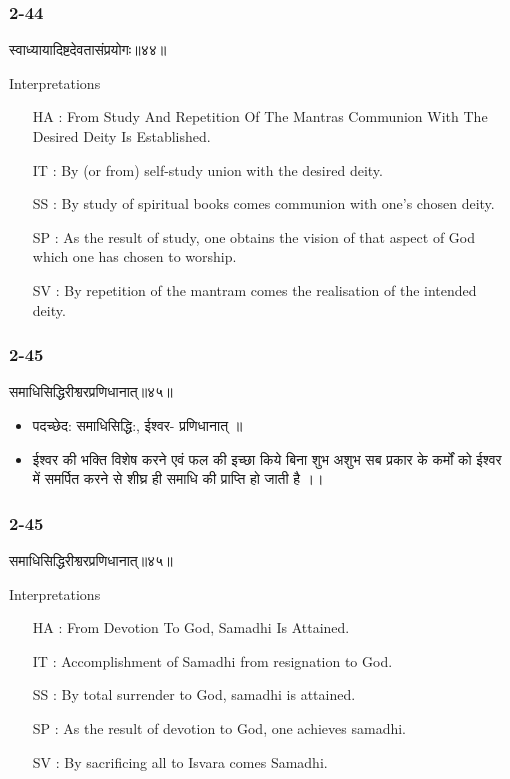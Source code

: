 \begin{frame}[fragile]\frametitle{2-44}
\begin{sanskrit}
स्वाध्यायादिष्टदेवतासंप्रयोगः॥४४॥
\end{sanskrit}

Interpretations
\begin{itemize}
\item [HA]: From Study And Repetition Of The Mantras Communion With The Desired Deity Is Established.
\item [IT]: By (or from) self-study union with the desired deity.
\item [SS]: By study of spiritual books comes communion with one’s chosen deity.
\item [SP]: As the result of study, one obtains the vision of that aspect of God which one has chosen to worship.
\item [SV]: By repetition of the mantram comes the realisation of the intended deity. 
\end{itemize}
\end{frame}

\begin{frame}[fragile]\frametitle{2-45}
\begin{sanskrit}
समाधिसिद्धिरीश्वरप्रणिधानात्॥४५॥
\end{sanskrit}

\begin{itemize}
\item पदच्छेद: समाधिसिद्धि:, ईश्वर- प्रणिधानात् ॥
\item ईश्वर की भक्ति विशेष करने एवं फल की इच्छा किये बिना शुभ अशुभ सब प्रकार के कर्मों को ईश्वर में समर्पित करने से शीघ्र ही समाधि की प्राप्ति हो जाती है ।।
\end{itemize}
	
\end{frame}

\begin{frame}[fragile]\frametitle{2-45}
\begin{sanskrit}
समाधिसिद्धिरीश्वरप्रणिधानात्॥४५॥
\end{sanskrit}

Interpretations
\begin{itemize}
\item [HA]: From Devotion To God, Samadhi Is Attained.
\item [IT]: Accomplishment of Samadhi from resignation to God.
\item [SS]: By total surrender to God, samadhi is attained.
\item [SP]: As the result of devotion to God, one achieves samadhi.
\item [SV]: By sacrificing all to Isvara comes Samadhi. 
\end{itemize}
\end{frame}


